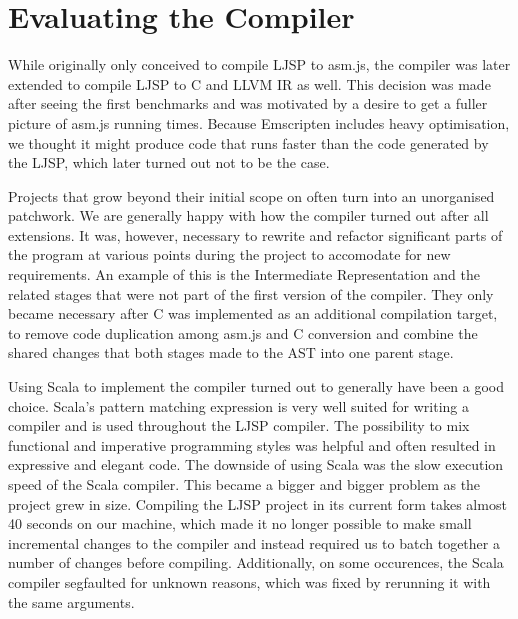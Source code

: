 \documentclass[11pt]{report}
\begin{document}
\section{Evaluating the Compiler}

While originally only conceived to compile LJSP to asm.js, the compiler was later extended to compile LJSP to C and LLVM IR as well. This decision was made after seeing the first benchmarks and was motivated by a desire to get a fuller picture of asm.js running times. Because Emscripten includes heavy optimisation, we thought it might produce code that runs faster than the code generated by the LJSP, which later turned out not to be the case.

Projects that grow beyond their initial scope on often turn into an unorganised patchwork. We are generally happy with how the compiler turned out after all extensions. It was, however, necessary to rewrite and refactor significant parts of the program at various points during the project to accomodate for new requirements. An example of this is the Intermediate Representation and the related stages that were not part of the first version of the compiler. They only became necessary after C was implemented as an additional compilation target, to remove code duplication among asm.js and C conversion and combine the shared changes that both stages made to the AST into one parent stage.

Using Scala to implement the compiler turned out to generally have been a good choice. Scala's pattern matching expression is very well suited for writing a compiler and is used throughout the LJSP compiler. The possibility to mix functional and imperative programming styles was helpful and often resulted in expressive and elegant code. The downside of using Scala was the slow execution speed of the Scala compiler. This became a bigger and bigger problem as the project grew in size. Compiling the LJSP project in its current form takes almost 40 seconds on our machine, which made it no longer possible to make small incremental changes to the compiler and instead required us to batch together a number of changes before compiling. Additionally, on some occurences, the Scala compiler segfaulted for unknown reasons, which was fixed by rerunning it with the same arguments.
\end{document}
